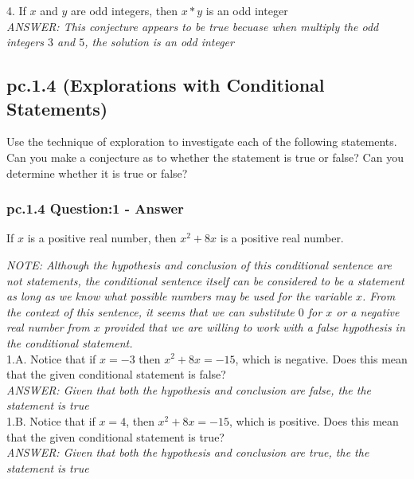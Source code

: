 4. If $x$ and $y$ are odd integers, then $x*y$ is an odd integer \\
{\it ANSWER: This conjecture appears to be true becuase when multiply the odd integers $3$ and $5$, the solution is an odd integer} \\


\newpage
\subsection{pc.1.4 (Explorations with Conditional Statements)}

Use the technique of exploration to investigate each of the following statements. Can you make a conjecture as to whether the statement is true or false? Can you determine whether it is true or false?

\subsubsection*{pc.1.4 Question:1 - Answer}

\begin{tcolorbox}
\begin{theorem}
If $x$ is a positive real number, then $x^2 + 8x$ is a positive real number.
\end{theorem}
\end{tcolorbox}

{\it NOTE: Although the hypothesis and conclusion of this conditional sentence are not statements, the conditional sentence itself can be considered to be a statement as long as we know what possible numbers may be used for the variable $x$. From the context of this sentence, it seems that we can substitute $0$ for $x$ or a negative real number from $x$ provided that we are willing to work with a false hypothesis in the conditional statement.} \\

1.A. Notice that  if $x=-3$ then $x^2 + 8x = -15$, which is negative. Does this mean that the given conditional statement is false? \\
{\it ANSWER: Given that both the hypothesis and conclusion are false, the the statement is true} \\

1.B. Notice that if $x=4$, then $x^2 + 8x = -15$, which is positive. Does this mean that the given conditional statement is true? \\
{\it ANSWER: Given that both the hypothesis and conclusion are true, the the statement is true} \\

